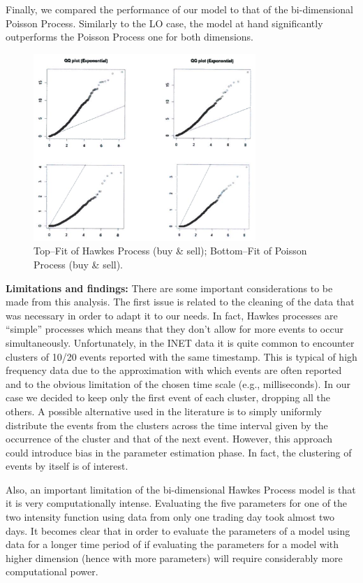 Finally, we compared the performance of our model to that of the bi-dimensional Poisson Process. Similarly to the LO case, the model at hand significantly outperforms the Poisson Process one for both dimensions. 
	\begin{figure}[!ht]
   	\centering
   	\includegraphics[width=0.75\textwidth]{chapters/chapter_trade_data_models/figures/4fig.png} 
   	\caption{Top--Fit of Hawkes Process (buy \& sell); Bottom--Fit of Poisson Process (buy \& sell). \label{fig:4fig6}}
	\end{figure}


\noindent\textbf{Limitations and findings:} There are some important considerations to be made from this analysis. The first issue is related to the cleaning of the data that was necessary in order to adapt it to our needs. In fact, Hawkes processes are ``simple'' processes which means that they don't allow for more events to occur simultaneously. Unfortunately, in the INET data it is quite common to encounter clusters of 10/20 events reported with the same timestamp. This is typical of high frequency data due to the approximation with which events are often reported and to the obvious limitation of the chosen time scale (e.g., milliseconds). In our case we decided to keep only the first event of each cluster, dropping all the others. A possible alternative used in the literature is to simply uniformly distribute the events from the clusters across the time interval given by the occurrence of the cluster and that of the next event. However, this approach could introduce bias in the parameter estimation phase. In fact, the clustering of events by itself is of interest.


Also, an important limitation of the bi-dimensional Hawkes Process model is that it is very computationally intense. Evaluating the five parameters for one of the two intensity function using data from only one trading day took almost two days. It becomes clear that in order to evaluate the parameters of a model using data for a longer time period of if evaluating the parameters for a model with higher dimension (hence with more parameters) will require considerably more computational power. 



